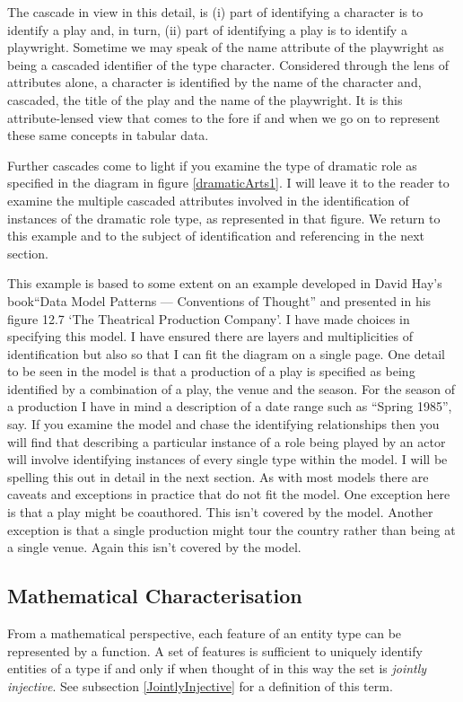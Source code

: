 The cascade in view in this detail, is 
(i)  part of identifying a character is to identify a play and, in turn,
(ii) part of identifying a play is to identify a playwright. 
Sometime we may speak of the name attribute of the playwright as being a cascaded identifier of the type character. Considered through the lens of attributes alone, a character is identified by the name of the character and, 
cascaded, the title of the play and the name of the playwright.
It is this attribute-lensed view that comes to the fore if and when we go on to represent these same concepts in tabular data.  

Further cascades come to light if you examine the type of dramatic role 
as specified in the diagram in figure \ref{dramaticArts1}. I will leave it to the reader to examine the multiple cascaded attributes involved in the identification of instances of the dramatic role type, as represented in that figure. 
We return to this example and to the subject of identification and referencing in the next section.

{This example is based to some extent on an example developed 
in David Hay's book``Data Model Patterns --- Conventions of Thought''
and presented in his figure 12.7 `The Theatrical Production Company'.
I have made choices in specifying this model.
I have ensured there are layers and multiplicities of identification but also so that I can fit the diagram on a single page. 
One detail to be seen in the model is that a production of a play is specified as 
being identified by a combination of a play, the venue and the season.
For the season of a production I have in mind a description of a date range such as  ``Spring 1985'', say. 
If you examine the model and chase the identifying relationships
then you will find that describing a particular instance of a role being played by an actor will involve identifying
instances of every single type within the model. I will be spelling this out in detail in the next section.
As with most models there are caveats and exceptions in practice that do not fit the model. 
One exception here is that a play might be coauthored. This isn't covered by the model.
Another exception is that a single production might tour the country rather than being at a single venue. Again this isn't covered by the model. }

\subsection {Mathematical Characterisation}
\mynote From a mathematical perspective, 
each feature of an entity type can be represented by a function. A set of features is sufficient to uniquely identify entities of a type if and only if when thought  of in this way the set is \textit{jointly injective}.   
See subsection \ref{JointlyInjective} for a definition of this term.

